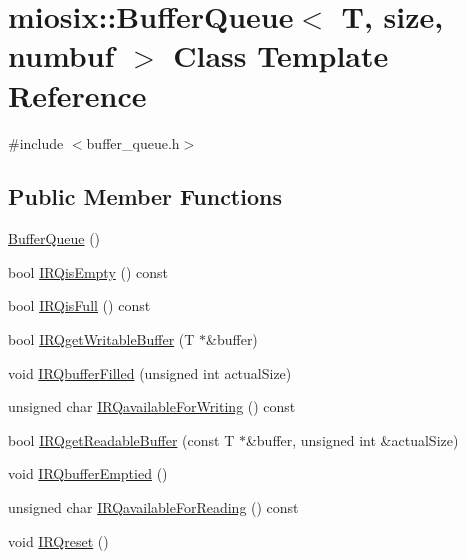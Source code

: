 \hypertarget{classmiosix_1_1_buffer_queue}{\section{miosix\-:\-:Buffer\-Queue$<$ T, size, numbuf $>$ Class Template Reference}
\label{classmiosix_1_1_buffer_queue}
}


{\ttfamily \#include $<$buffer\-\_\-queue.\-h$>$}

\subsection*{Public Member Functions}
\begin{DoxyCompactItemize}
\item 
\hyperlink{classmiosix_1_1_buffer_queue_ad76f164835965da281ca5e16764cbe11}{Buffer\-Queue} ()
\item 
bool \hyperlink{classmiosix_1_1_buffer_queue_a75896b85560f89be25ede35052de7829}{I\-R\-Qis\-Empty} () const 
\item 
bool \hyperlink{classmiosix_1_1_buffer_queue_a48088e1cab1aac8505c3893a193ea5dc}{I\-R\-Qis\-Full} () const 
\item 
bool \hyperlink{classmiosix_1_1_buffer_queue_a97c6c15cd7c09028b9c30291272d0129}{I\-R\-Qget\-Writable\-Buffer} (T $\ast$\&buffer)
\item 
void \hyperlink{classmiosix_1_1_buffer_queue_a550133b3f1824f81241c88339340008e}{I\-R\-Qbuffer\-Filled} (unsigned int actual\-Size)
\item 
unsigned char \hyperlink{classmiosix_1_1_buffer_queue_a81461eb6dc8c5c5015e385fa480fd639}{I\-R\-Qavailable\-For\-Writing} () const 
\item 
bool \hyperlink{classmiosix_1_1_buffer_queue_a605ae0b1ae5eb2466fd46df48a2eadae}{I\-R\-Qget\-Readable\-Buffer} (const T $\ast$\&buffer, unsigned int \&actual\-Size)
\item 
void \hyperlink{classmiosix_1_1_buffer_queue_aa02dd3a85ba611dcc63acfa94da1a9ba}{I\-R\-Qbuffer\-Emptied} ()
\item 
unsigned char \hyperlink{classmiosix_1_1_buffer_queue_ab13eb4109caf0f258e6dfd6795513a40}{I\-R\-Qavailable\-For\-Reading} () const 
\item 
void \hyperlink{classmiosix_1_1_buffer_queue_aecbbd37c0ef8a6bbd4ac9e447d2f95e8}{I\-R\-Qreset} ()
\end{DoxyCompactItemize}
